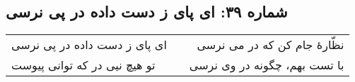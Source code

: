 \begin{center}
\section*{شماره ۳۹: ای پای ز دست داده در پی نرسی}
\label{sec:039}
\begin{longtable}{l p{0.5cm} r}
ای پای ز دست داده در پی نرسی
&&
نظّارهٔ جام کن که در می نرسی
\\
تو هیچ نیی در که توانی پیوست
&&
با تست بهم، چگونه در وی نرسی
\\
\end{longtable}
\end{center}
